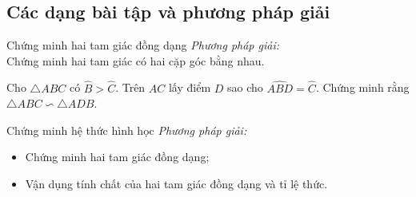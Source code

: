 \subsection{Các dạng bài tập và phương pháp giải}
\begin{dang}{Chứng minh hai tam giác đồng dạng}
	\emph{Phương pháp giải:}\\
	Chứng minh hai tam giác có hai cặp góc bằng nhau.
\end{dang}
\begin{vd}%
	Cho $\triangle ABC$ có $ \widehat{B}>\widehat{C} $. Trên $ AC $ lấy điểm $ D $ sao cho $ \widehat{ABD}=\widehat{C} $. Chứng minh rằng $\triangle ABC\backsim\triangle ADB$.
\end{vd}
\begin{dang}{Chứng minh hệ thức hình học}
	\emph{Phương pháp giải:}
	\begin{itemize}
		\item Chứng minh hai tam giác đồng dạng;
		\item Vận dụng tính chất của hai tam giác đồng dạng và tỉ lệ thức.
	\end{itemize}
\end{dang}
